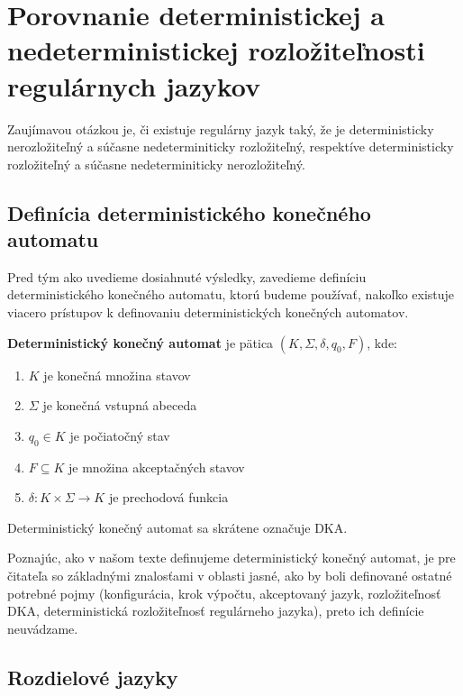 \chapter[Porovnanie determinizmu a nedeterminizmu]{Porovnanie deterministickej a nedeterministickej rozložiteľnosti regulárnych jazykov}
\label{kap:det_vs_ndet}

Zaujímavou otázkou je, či existuje regulárny jazyk taký, že je deterministicky nerozložiteľný a súčasne nedeterminiticky rozložiteľný, respektíve deterministicky rozložiteľný a súčasne nedeterminiticky nerozložiteľný.

\section{Definícia deterministického konečného automatu}

Pred tým ako uvedieme dosiahnuté výsledky, zavedieme definíciu deterministického konečného automatu, ktorú budeme používať, nakoľko existuje viacero prístupov k definovaniu deterministických konečných automatov.

\begin{definition}
\textbf{Deterministický konečný automat} je pätica $ (K, \Sigma, \delta, q_0, F) $, kde:
\begin{enumerate}  
\item $ K $ je konečná množina stavov
\item $ \Sigma $ je konečná vstupná abeceda
\item $ q_0 \in K $ je počiatočný stav
\item $ F \subseteq K $ je množina akceptačných stavov
\item $ \delta : K \times \Sigma \rightarrow K $ je prechodová funkcia
\end{enumerate}
\end{definition}

\begin{note}
Deterministický konečný automat sa skrátene označuje DKA.
\end{note}

Poznajúc, ako v našom texte definujeme deterministický konečný automat, je pre čitateľa so základnými znalosťami v oblasti jasné, ako by boli definované ostatné potrebné pojmy (konfigurácia, krok výpočtu, akceptovaný jazyk, rozložiteľnosť DKA, deterministická rozložiteľnosť regulárneho jazyka), preto ich definície neuvádzame.

\section{Rozdielové jazyky}

